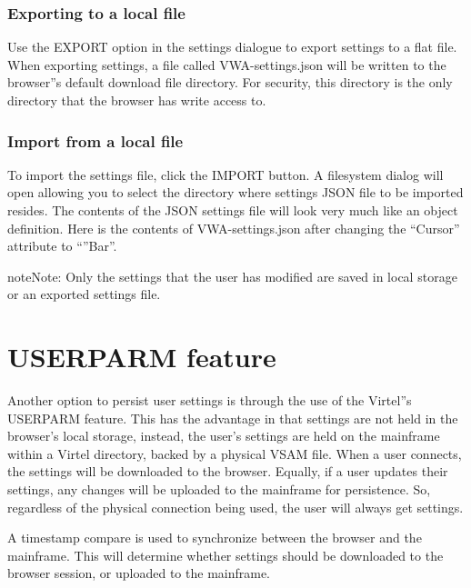 \documentclass[letterpaper,10pt,english]{sphinxmanual}
\begin{document}
\subsection{Exporting to a local file}
\label{\detokenize{TN202002:exporting-to-a-local-file}}
Use the EXPORT option in the settings dialogue to export settings to a flat file. When exporting settings, a file called VWA-settings.json will be written to the browser”s default download file directory. For security, this directory is the only directory that the browser has write access to.


\subsection{Import from a local file}
\label{\detokenize{TN202002:import-from-a-local-file}}
To import the settings file, click the IMPORT button. A filesystem dialog will open allowing you to select the directory where settings JSON file to be imported resides.
The contents of the JSON settings file will look very much like an object definition. Here is the contents of VWA-settings.json after changing the “Cursor” attribute to “”Bar”.



\begin{sphinxadmonition}{note}{Note:}
Only the settings that the user has modified are saved in local storage or an exported settings file.
\end{sphinxadmonition}


\chapter{USERPARM feature}
\label{\detokenize{TN202002:userparm-feature}}
Another option to persist user settings is through the use of the Virtel”s USERPARM feature. This has the advantage in that settings are not held in the browser’s local storage, instead, the user’s settings are held on the mainframe within a Virtel directory, backed by a physical VSAM file. When a user connects, the settings will be downloaded to the browser. Equally, if a user updates their settings, any changes will be uploaded to the mainframe for persistence. So, regardless of the physical connection being used, the user will always get  settings.

A timestamp compare is used to synchronize between the browser and the mainframe. This will determine whether settings should be downloaded to the browser session, or uploaded to the mainframe.
\end{document}
